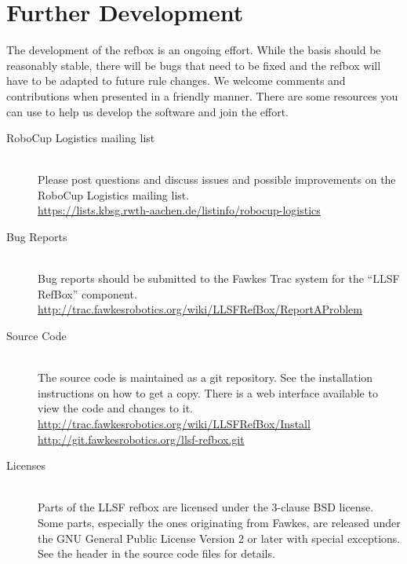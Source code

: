 \documentclass[a4paper]{article}
\begin{document}
\section{Further Development}
\label{sec:dev}
The development of the refbox is an ongoing effort. While the basis
should be reasonably stable, there will be bugs that need to be fixed
and the refbox will have to be adapted to future rule changes. We
welcome comments and contributions when presented in a friendly
manner. There are some resources you can use to help us develop the
software and join the effort.

\begin{description}
\item[RoboCup Logistics mailing list] \hfill\\
  Please post questions and discuss issues and possible improvements
  on the RoboCup Logistics mailing list.\\
  \url{https://lists.kbsg.rwth-aachen.de/listinfo/robocup-logistics}
\item[Bug Reports] \hfill\\
  Bug reports should be submitted to the Fawkes Trac system for the
  ``LLSF RefBox'' component.\\
  \url{http://trac.fawkesrobotics.org/wiki/LLSFRefBox/ReportAProblem}
\item[Source Code] \hfill\\
  The source code is maintained as a git repository. See the
  installation instructions on how to get a copy. There is a web
  interface available to view the code and changes to it.\\
  \url{http://trac.fawkesrobotics.org/wiki/LLSFRefBox/Install}\\
  \url{http://git.fawkesrobotics.org/llsf-refbox.git}
\item[Licenses] \hfill\\
  Parts of the LLSF refbox are licensed under the 3-clause BSD
  license. Some parts, especially the ones originating from Fawkes,
  are released under the GNU General Public License Version 2 or later
  with special exceptions. See the header in the source code files for
  details.
\end{description}

{\small


}
\end{document}
